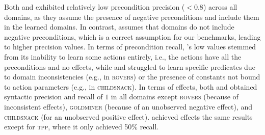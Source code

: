 Both \samshort{} and \nolam{} exhibited relatively low precondition precision ($<0.8$) across all domains, as they assume the presence of negative preconditions and include them in the learned domains. 
In contrast, \offlam{} assumes that domains do not include negative preconditions, which is a correct assumption for our benchmarks, leading to higher precision values.
In terms of precondition recall, \samshort{}'s low values stemmed from its inability to learn some actions entirely, i.e., the actions have all the preconditions and no effects, while \offlam{} and \nolam{} struggled to learn specific predicates due to domain inconsistencies (e.g., in \textsc{rovers}) or the presence of constants not bound to action parameters (e.g., in \textsc{childsnack}).
In terms of effects, both \offlam{} and \nolam obtained syntactic precision and recall of $1$ in all domains except \textsc{rovers} (because of inconsistent effects), \textsc{goldminer} (because of an unobserved negative effect), and \textsc{childsnack} (for an unobserved positive effect). \samshort{} achieved effects the same results except for \textsc{tpp}, where it only achieved 50\% recall.

